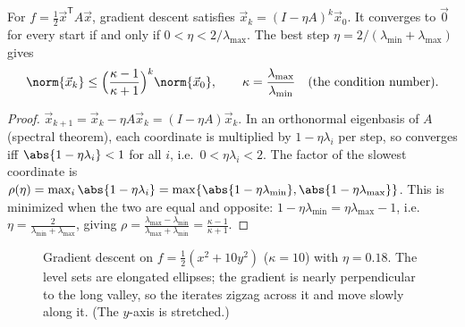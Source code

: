 \begin{theorem}\label{thm:gdquad}
For $f=\frac12\vec x^{\mathsf T}A\vec x$, gradient descent satisfies $\vec x_k=(I-\eta A)^k\vec x_0$. It converges to $\vec 0$ for every start if and only if $0<\eta<2/\lambda_{\max}$. The best step $\eta=2/(\lambda_{\min}+\lambda_{\max})$ gives
\[
\norm{\vec x_k}\le\Bigl(\frac{\kappa-1}{\kappa+1}\Bigr)^k\norm{\vec x_0},\qquad\kappa=\frac{\lambda_{\max}}{\lambda_{\min}}\quad\text{(the condition number).}
\]
\end{theorem}

\begin{proof}
$\vec x_{k+1}=\vec x_k-\eta A\vec x_k=(I-\eta A)\vec x_k$. In an orthonormal eigenbasis of $A$ (spectral theorem), each coordinate is multiplied by $1-\eta\lambda_i$ per step, so converges iff $\abs{1-\eta\lambda_i}<1$ for all $i$, i.e.\ $0<\eta\lambda_i<2$. The factor of the slowest coordinate is $\rho(\eta)=\max_i\abs{1-\eta\lambda_i}=\max\{\abs{1-\eta\lambda_{\min}},\abs{1-\eta\lambda_{\max}}\}$. This is minimized when the two are equal and opposite: $1-\eta\lambda_{\min}=\eta\lambda_{\max}-1$, i.e.\ $\eta=\frac2{\lambda_{\min}+\lambda_{\max}}$, giving $\rho=\frac{\lambda_{\max}-\lambda_{\min}}{\lambda_{\max}+\lambda_{\min}}=\frac{\kappa-1}{\kappa+1}$.
\end{proof}

\begin{figure}[ht]
\centering
{}
\caption{Gradient descent on $f=\frac12(x^2+10y^2)$ ($\kappa=10$) with $\eta=0.18$. The level sets are elongated ellipses; the gradient is nearly perpendicular to the long valley, so the iterates zigzag across it and move slowly along it. (The $y$-axis is stretched.)}
\label{fig:gdzigzag}
\end{figure}

